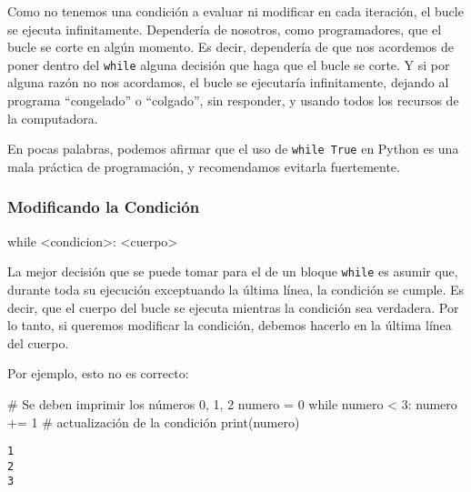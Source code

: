 \documentclass[
  letterpaper,
  DIV=11,
  numbers=noendperiod]{scrreprt}
\newenvironment{Shaded}{\begin{snugshade}}{\end{snugshade}}
\newcommand{\BuiltInTok}[1]{\textcolor[rgb]{0.00,0.23,0.31}{#1}}
\newcommand{\CommentTok}[1]{\textcolor[rgb]{0.37,0.37,0.37}{#1}}
\newcommand{\ControlFlowTok}[1]{\textcolor[rgb]{0.00,0.23,0.31}{#1}}
\newcommand{\DecValTok}[1]{\textcolor[rgb]{0.68,0.00,0.00}{#1}}
\newcommand{\NormalTok}[1]{\textcolor[rgb]{0.00,0.23,0.31}{#1}}
\newcommand{\OperatorTok}[1]{\textcolor[rgb]{0.37,0.37,0.37}{#1}}
\begin{document}
Como no tenemos una condición a evaluar ni modificar en cada iteración,
el bucle se ejecuta infinitamente. Dependería de nosotros, como
programadores, que el bucle se corte en algún momento. Es decir,
dependería de que nos acordemos de poner dentro del \texttt{while}
alguna decisión que haga que el bucle se corte. Y si por alguna razón no
nos acordamos, el bucle se ejecutaría infinitamente, dejando al programa
``congelado'' o ``colgado'', sin responder, y usando todos los recursos
de la computadora.

En pocas palabras, podemos afirmar que el uso de \texttt{while\ True} en
Python es una mala práctica de programación, y recomendamos evitarla
fuertemente.

\subsubsection{Modificando la
Condición}\label{modificando-la-condiciuxf3n}

\begin{Shaded}
\begin{Highlighting}[]
\ControlFlowTok{while} \OperatorTok{\textless{}}\NormalTok{condicion}\OperatorTok{\textgreater{}}\NormalTok{:}
  \OperatorTok{\textless{}}\NormalTok{cuerpo}\OperatorTok{\textgreater{}}
\end{Highlighting}
\end{Shaded}

La mejor decisión que se puede tomar para el de un bloque \texttt{while}
es asumir que, durante toda su ejecución exceptuando la última línea, la
condición se cumple. Es decir, que el cuerpo del bucle se ejecuta
mientras la condición sea verdadera. Por lo tanto, si queremos modificar
la condición, debemos hacerlo en la última línea del cuerpo.

Por ejemplo, esto no es correcto:

\begin{Shaded}
\begin{Highlighting}[]
\CommentTok{\# Se deben imprimir los números 0, 1, 2}
\NormalTok{numero }\OperatorTok{=} \DecValTok{0}
\ControlFlowTok{while}\NormalTok{ numero }\OperatorTok{\textless{}} \DecValTok{3}\NormalTok{:}
\NormalTok{  numero }\OperatorTok{+=} \DecValTok{1}     \CommentTok{\# actualización de la condición}
  \BuiltInTok{print}\NormalTok{(numero)}
\end{Highlighting}
\end{Shaded}

\begin{verbatim}
1
2
3
\end{verbatim}
\end{document}
